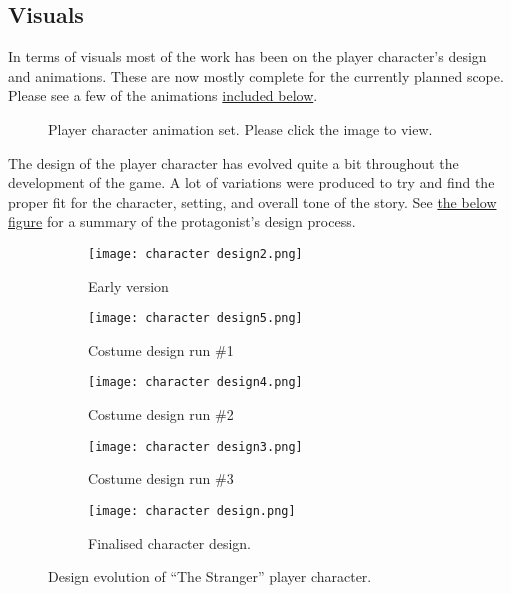 \clearpage
\subsection{Visuals}
In terms of visuals most of the work has been on the player character's design and animations. These are now mostly complete for the currently planned scope. Please see a few of the animations \hyperref[fig:animations]{included below}.

\begin{figure}[h]
  \centering
  \caption{Player character animation set. Please click the image to view.}
  \label{fig:animations}
\end{figure}

The design of the player character has evolved quite a bit throughout the development of the game. A lot of variations were produced to try and find the proper fit for the character, setting, and overall tone of the story. See \hyperref[fig:designs]{the below figure} for a summary of the protagonist's design process.
\clearpage

\begin{figure}
  \centering
  \begin{subfigure}[b]{0.45\textwidth}
    \texttt{[image: character design2.png]}
    \caption{Early version}
  \end{subfigure}
  \begin{subfigure}[b]{0.45\textwidth}
    \texttt{[image: character design5.png]}
    \caption{Costume design run \#1}
  \end{subfigure}
  \begin{subfigure}[b]{0.45\textwidth}
    \texttt{[image: character design4.png]}
    \caption{Costume design run \#2}
  \end{subfigure}
  \begin{subfigure}[b]{0.45\textwidth}
    \texttt{[image: character design3.png]}
    \caption{Costume design run \#3}
  \end{subfigure}
  \begin{subfigure}[b]{0.7\textwidth}
    \texttt{[image: character design.png]}
    \caption{Finalised character design.}
  \end{subfigure}
  \label{fig:designs}
  \caption{Design evolution of ``The Stranger'' player character.}
\end{figure}

